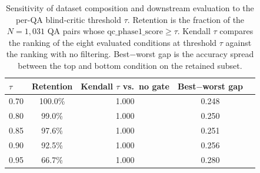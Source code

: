\begin{table}[t!]
  \caption{Sensitivity of dataset composition and downstream evaluation to the per-QA blind-critic threshold $\tau$. Retention is the fraction of the $N{=}1{,}031$ QA pairs whose $\text{qc\_phase1\_score} \geq \tau$. Kendall $\tau$ compares the ranking of the eight evaluated conditions at threshold $\tau$ against the ranking with no filtering. Best$-$worst gap is the accuracy spread between the top and bottom condition on the retained subset.}
  \label{tab:sensitivity-threshold}
  \centering
  \small
  \begin{tabular}{lcccc}
    \toprule
    \textbf{$\tau$} & \textbf{Retention} & \textbf{Kendall $\tau$ vs.\ no gate} & \textbf{Best$-$worst gap} \\
    \midrule
    0.70 & 100.0\% & 1.000 & 0.248 \\
    0.80 & 99.0\% & 1.000 & 0.250 \\
    0.85 & 97.6\% & 1.000 & 0.251 \\
    0.90 & 92.5\% & 1.000 & 0.256 \\
    0.95 & 66.7\% & 1.000 & 0.280 \\
    \bottomrule
  \end{tabular}
\end{table}
